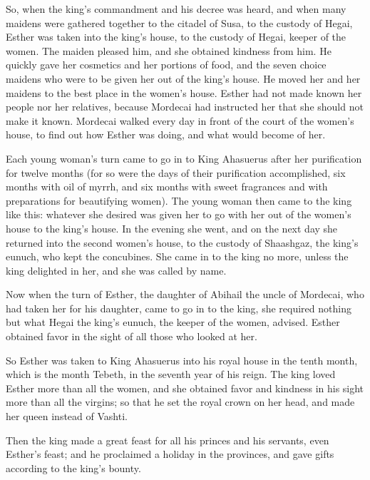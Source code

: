  So, when the king's commandment and his decree was heard,
and when many maidens were gathered together to the citadel of Susa, to
the custody of Hegai, Esther was taken into the king's house, to the
custody of Hegai, keeper of the women.  The maiden pleased
him, and she obtained kindness from him. He quickly gave her cosmetics
and her portions of food, and the seven choice maidens who were to be
given her out of the king's house. He moved her and her maidens to the
best place in the women's house.  Esther had not made known
her people nor her relatives, because Mordecai had instructed her that
she should not make it known.  Mordecai walked every day in
front of the court of the women's house, to find out how Esther was
doing, and what would become of her.

 Each young woman's turn came to go in to King Ahasuerus
after her purification for twelve months (for so were the days of their
purification accomplished, six months with oil of myrrh, and six months
with sweet fragrances and with preparations for beautifying women).
 The young woman then came to the king like this: whatever
she desired was given her to go with her out of the women's house to the
king's house.  In the evening she went, and on the next day
she returned into the second women's house, to the custody of Shaashgaz,
the king's eunuch, who kept the concubines. She came in to the king no
more, unless the king delighted in her, and she was called by name.

 Now when the turn of Esther, the daughter of Abihail the
uncle of Mordecai, who had taken her for his daughter, came to go in to
the king, she required nothing but what Hegai the king's eunuch, the
keeper of the women, advised. Esther obtained favor in the sight of all
those who looked at her.

 So Esther was taken to King Ahasuerus into his royal house
in the tenth month, which is the month Tebeth, in the seventh year of
his reign.  The king loved Esther more than all the women,
and she obtained favor and kindness in his sight more than all the
virgins; so that he set the royal crown on her head, and made her queen
instead of Vashti.

 Then the king made a great feast for all his princes and
his servants, even Esther's feast; and he proclaimed a holiday in the
provinces, and gave gifts according to the king's bounty.

